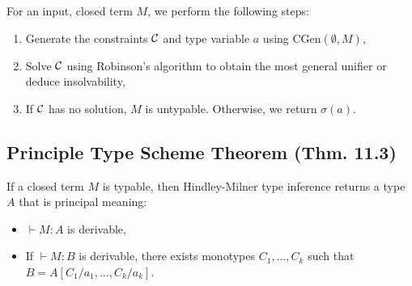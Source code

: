 For an input, closed term $M$, we perform the following steps: \begin{enumerate}
    \item Generate the constraints $\mathcal{C}$ and type variable $a$ using
        CGen$(\emptyset, M)$,
    \item Solve $\mathcal{C}$ using Robinson's algorithm to obtain the most general
        unifier or deduce insolvability,
    \item If $\mathcal{C}$ has no solution, $M$ is untypable. Otherwise, we
        return $\sigma(a)$.
\end{enumerate}

\subsection{Principle Type Scheme Theorem (Thm. 11.3)}

If a closed term $M$ is typable, then Hindley-Milner type inference
returns a type $A$ that is principal meaning:
\begin{itemize}
    \item $\vdash M : A$ is derivable,
    \item If $\vdash M : B$ is derivable, there exists monotypes 
        $C_1, \ldots, C_k$ such that $B = A[C_1/a_1, \ldots, C_k/a_k]$.
\end{itemize}
